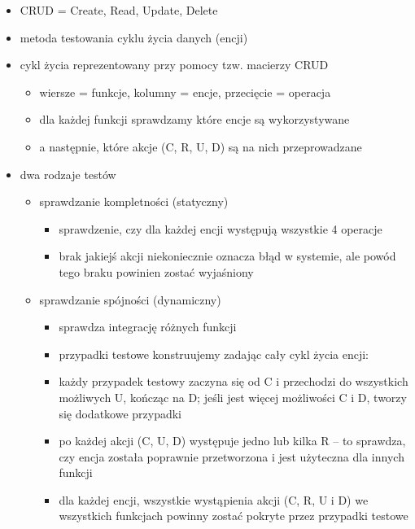 \documentclass[../main.tex]{subfiles}
\begin{document}
    \begin{itemize}
        \item CRUD = Create, Read, Update, Delete
        \item metoda testowania cyklu życia danych (encji)
        \item cykl życia reprezentowany przy pomocy tzw. macierzy CRUD
        \begin{itemize}
            \item wiersze = funkcje, kolumny = encje, przecięcie = operacja
            \item dla każdej funkcji sprawdzamy które encje są wykorzystywane
            \item a następnie, które akcje (C, R, U, D) są na nich przeprowadzane
        \end{itemize}
        \item dwa rodzaje testów
        \begin{itemize}
            \item sprawdzanie kompletności (statyczny)
            \begin{itemize}
                \item sprawdzenie, czy dla każdej encji występują wszystkie 4 operacje
                \item brak jakiejś akcji niekoniecznie oznacza błąd w systemie, ale powód tego braku powinien zostać wyjaśniony
            \end{itemize}
            \item sprawdzanie spójności (dynamiczny)
            \begin{itemize}
                \item sprawdza integrację różnych funkcji
                \item przypadki testowe konstruujemy zadając cały cykl życia encji:
                \item każdy przypadek testowy zaczyna się od C i przechodzi do
                wszystkich możliwych U, kończąc na D; jeśli jest więcej możliwości
                C i D, tworzy się dodatkowe przypadki
                \item po każdej akcji (C, U, D) występuje jedno lub kilka R – to sprawdza,
                czy encja została poprawnie przetworzona i jest użyteczna dla innych funkcji
                \item dla każdej encji, wszystkie wystąpienia akcji (C, R, U i D) we
                wszystkich funkcjach powinny zostać pokryte przez przypadki testowe
            \end{itemize}
        \end{itemize}
    \end{itemize}
\end{document}
